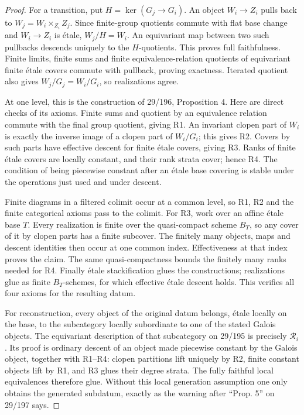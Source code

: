 \begin{proof}
For a transition, put $H=\ker(G_j\to G_i)$. An object $W_i\to Z_i$
pulls back to $W_j=W_i\times_{Z_i}Z_j$. Since finite-group
quotients commute with flat base change and $W_i\to Z_i$ is
\'etale, $W_j/H=W_i$. An equivariant map between two such pullbacks
descends uniquely to the $H$-quotients. This proves full faithfulness.
Finite limits, finite sums and finite equivalence-relation quotients
of equivariant finite \'etale covers commute with pullback, proving
exactness. Iterated quotient also gives
$W_j/G_j=W_i/G_i$, so realizations agree.

At one level, this is the construction of 29/196, Proposition 4.
Here are direct checks of its axioms. Finite sums and quotient by an
equivalence relation commute with the final group quotient, giving R1.
An invariant clopen part of $W_i$ is exactly the inverse image of a
clopen part of $W_i/G_i$; this gives R2. Covers by such parts have
effective descent for finite \'etale covers, giving R3. Ranks of
finite \'etale covers are locally constant, and their rank strata
cover; hence R4. The condition of being piecewise constant after
an \'etale base covering is stable under the operations just used
and under descent.

Finite diagrams in a filtered colimit occur at a common level, so
R1, R2 and the finite categorical axioms pass to the colimit.
For R3, work over an affine \'etale base $T$. Every realization is
finite over the quasi-compact scheme $B_T$, so any cover of it by
clopen parts has a finite subcover. The finitely many objects, maps
and descent identities then occur at one common index. Effectiveness
at that index proves the claim. The same quasi-compactness bounds
the finitely many ranks needed for R4. Finally \'etale stackification
glues the constructions; realizations glue as finite $B_T$-schemes,
for which effective \'etale descent holds. This verifies all four
axioms for the resulting datum.

For reconstruction, every object of the original datum belongs,
\'etale locally on the base, to the subcategory locally subordinate
to one of the stated Galois objects. The equivariant description of
that subcategory on 29/195 is precisely $\mathscr R_i$. Its proof
is ordinary descent of an object made piecewise constant by the
Galois object, together with R1--R4: clopen partitions lift uniquely by R2,
finite constant objects lift by R1, and R3 glues their degree strata. The fully faithful local equivalences
therefore glue. Without this local generation assumption one only
obtains the generated subdatum, exactly as the warning after
``Prop. 5'' on 29/197 says.
\end{proof}

